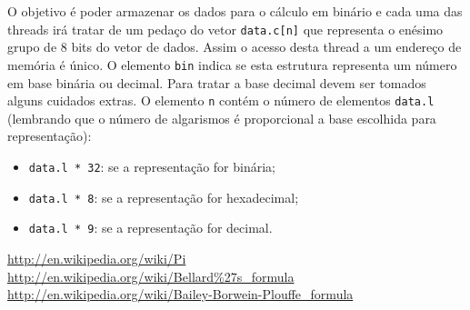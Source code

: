 \documentclass[12pt,a4paper]{article}
\begin{document}
O objetivo é poder armazenar os dados para o cálculo em binário e cada uma das threads irá tratar de um pedaço do vetor \verb+data.c[n]+ que representa o enésimo grupo de 8 bits do vetor de dados. Assim o acesso desta thread a um endereço de memória é único.
O elemento \verb+bin+ indica se esta estrutura representa um número em base binária ou decimal. Para tratar a base decimal devem ser tomados alguns cuidados extras.
O elemento \verb+n+ contém o número de elementos \verb+data.l+ (lembrando que o número de algarismos é proporcional a base escolhida para representação):

\begin{itemize}
\item \verb+data.l * 32+: se a representação for binária;
\item \verb+data.l * 8+: se a representação for hexadecimal;
\item \verb+data.l * 9+: se a representação for decimal.
\end{itemize}

\begin{thebibliography}{99}
\url{http://en.wikipedia.org/wiki/Pi}
\url{http://en.wikipedia.org/wiki/Bellard%27s_formula}
\url{http://en.wikipedia.org/wiki/Bailey-Borwein-Plouffe\_formula}
\end{thebibliography}
\end{document}
